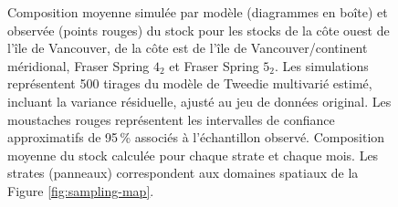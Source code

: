 \begin{figure}[htb]
    \centering
    \caption{Composition moyenne simulée par modèle (diagrammes en boîte) et observée (points rouges) du stock pour les stocks de la côte ouest de l'île de Vancouver, de la côte est de l'île de Vancouver/continent méridional, Fraser Spring $4_2$ et Fraser Spring $5_2$. Les simulations représentent 500 tirages du modèle de Tweedie multivarié estimé, incluant la variance résiduelle, ajusté au jeu de données original. Les moustaches rouges représentent les intervalles de confiance approximatifs de 95\,\% associés à l'échantillon observé. Composition moyenne du stock calculée pour chaque strate et chaque mois. Les strates (panneaux) correspondent aux domaines spatiaux de la Figure \ref{fig:sampling-map}.}
    \label{fig:posterior-stock2}
\end{figure}

